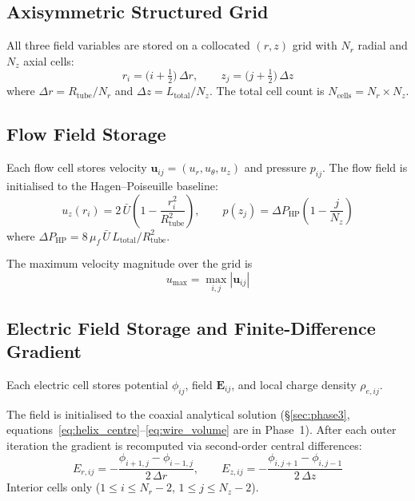 \documentclass[11pt,a4paper]{article}
\begin{document}
\subsection{Axisymmetric Structured Grid}

All three field variables are stored on a collocated $(r, z)$ grid with
$N_r$ radial and $N_z$ axial cells:
\begin{equation}\label{eq:grid}
  r_i = \bigl(i + \tfrac{1}{2}\bigr)\,\Delta r, \qquad
  z_j = \bigl(j + \tfrac{1}{2}\bigr)\,\Delta z
\end{equation}
where $\Delta r = R_{\mathrm{tube}} / N_r$ and
$\Delta z = L_{\mathrm{total}} / N_z$.  The total cell count is
$N_{\mathrm{cells}} = N_r \times N_z$.

\subsection{Flow Field Storage}

Each flow cell stores velocity $\bm{u}_{ij} = (u_r, u_\theta, u_z)$ and
pressure $p_{ij}$.  The flow field is initialised to the Hagen--Poiseuille
baseline:
\begin{equation}\label{eq:poiseuille_init}
  u_z(r_i) = 2\,\bar{U}\!\left(1 - \frac{r_i^2}{R_{\mathrm{tube}}^2}\right),
  \qquad
  p(z_j) = \Delta P_{\mathrm{HP}}\!\left(1 - \frac{j}{N_z}\right)
\end{equation}
where $\Delta P_{\mathrm{HP}} = 8\,\mu_f\,\bar{U}\,L_{\mathrm{total}} / R_{\mathrm{tube}}^2$.

The maximum velocity magnitude over the grid is
\begin{equation}\label{eq:umax}
  u_{\max} = \max_{i,j} |\bm{u}_{ij}|
\end{equation}

\subsection{Electric Field Storage and Finite-Difference Gradient}

Each electric cell stores potential $\phi_{ij}$, field
$\bm{E}_{ij}$, and local charge density $\rho_{e,ij}$.

The field is initialised to the coaxial analytical solution
(\S\ref{sec:phase3}, equations~\eqref{eq:helix_centre}--\eqref{eq:wire_volume}
are in Phase~1).  After each outer iteration the gradient is recomputed via
second-order central differences:
\begin{equation}\label{eq:E_fd}
  E_{r,ij} = -\frac{\phi_{i+1,j} - \phi_{i-1,j}}{2\,\Delta r},
  \qquad
  E_{z,ij} = -\frac{\phi_{i,j+1} - \phi_{i,j-1}}{2\,\Delta z}
\end{equation}
Interior cells only ($1 \le i \le N_r-2$, $1 \le j \le N_z-2$).
\end{document}
